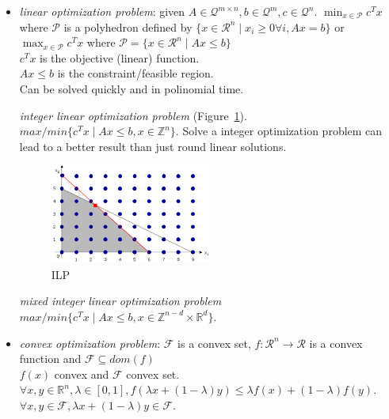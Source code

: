 \documentclass[main]{subfiles}
\begin{document}
\begin{itemize}
\item \emph{linear optimization problem}: given $A \in \mathcal{Q}^{m \times n}, b \in
\mathcal{Q}^{m}, c \in \mathcal{Q}^{n}$. $\displaystyle \min_{x \in
\mathcal{P}} c^{T}x$ where $\mathcal{P}$ is a polyhedron defined by $\{ x \in
\mathcal{R}^{n} \mid x_{i} \geq 0 \forall i, Ax = b \}$ or $\displaystyle
\max_{x \in \mathcal{P}} c^{T}x$ where $\mathcal{P} = \{ x \in
\mathcal{R}^{n} \mid Ax \leq b \}$ \\
$c^{T}x$ is the objective (linear) function. \\
$Ax \leq b$ is the constraint/feasible region.\\
Can be solved quickly and in polinomial time.

\subitem \emph{integer linear optimization problem} (Figure~\ref{fig:ILP}).
$max/min \{ c^{T}x \mid Ax \leq b, x \in \mathbb{Z}^{n} \}$.
Solve a integer optimization problem can lead to a better result than just
round linear solutions.

\begin{figure}
  \label{fig:ILP}
  \caption{ILP}
  \centering
    \includegraphics[width=0.5\textwidth]{imgs/ILP.png}
\end{figure}

\subitem \emph{mixed integer linear optimization problem}
$max/min \{ c^{T}x \mid Ax \leq b, x \in \mathbb{Z}^{n-d} \times
\mathbb{R}^{d} \}$.

\item \emph{convex optimization problem}: $\mathcal{F}$ is a convex set, $f:
\mathcal{R}^{n} \rightarrow \mathcal{R}$ is a convex function and $\mathcal{F}
\subseteq dom(f)$\\
$f(x)$ convex and $\mathcal{F}$ convex set. $\forall x, y \in \mathbb{R}^{n},
\lambda \in [0,1], f(\lambda x + (1-\lambda)y) \leq \lambda f(x) + (1-\lambda)
f(y)$. $\forall x,y \in \mathcal{F}, \lambda x + (1-\lambda)y \in \mathcal{F}$.




\end{itemize}
\end{document}
